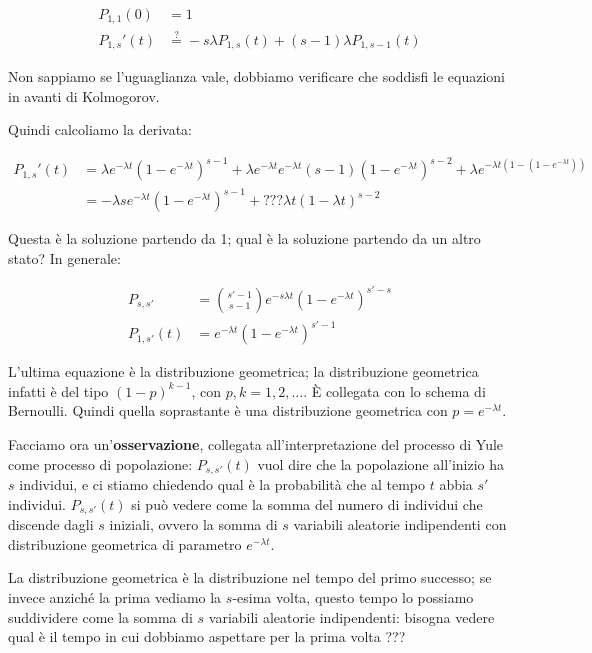 \documentclass[a4paper,12pt]{book}
\begin{document}
\begin{align*}
	P_{1,1}(0) & = 1 \\
	P_{1,s}'(t) & \overset{?}{=} -s \lambda P_{1,s}(t) + (s-1)\lambda P_{1,s-1}(t)
\end{align*}

Non sappiamo se l'uguaglianza vale, dobbiamo verificare che soddisfi le equazioni in avanti di Kolmogorov. 


Quindi calcoliamo la derivata:

\begin{align*}
	P_{1,s}'(t) & = \lambda e^{-\lambda t }(1 - e^{-\lambda t})^{s-1} + \lambda e^{-\lambda t} e^{-\lambda t}(s-1)(1-e^{-\lambda t})^{s-2}  + \lambda e^{-\lambda t(1 - (1- e^{-\lambda t}))} \\ %
	& = -\lambda s e^{-\lambda t}(1 - e^{-\lambda t})^{s-1} + ??? \lambda t(1 -\lambda t)^{s-2} %
\end{align*}

Questa è la soluzione partendo da 1; qual è la soluzione partendo da un altro stato? In generale:

\begin{align*}
	P_{s,s'} & = \binom{s'-1}{s-1}e^{-s\lambda t} (1 - e^{-\lambda t})^{s'-s} \\
	P_{1,s'}(t) & = e^{-\lambda t} (1 - e^{-\lambda t})^{s'-1}
\end{align*}

L'ultima equazione è la distribuzione geometrica; la distribuzione geometrica infatti è del tipo $ (1-p)^{k-1} $, con $ p,k = 1, 2, ... $. È collegata con lo schema di Bernoulli. Quindi quella soprastante è una distribuzione geometrica con $ p = e^{-\lambda t} $.

Facciamo ora un'\textbf{osservazione}, collegata all'interpretazione del processo di Yule come processo di popolazione: $ P_{s,s'}(t) $ vuol dire che la popolazione all'inizio ha $ s $ individui, e ci stiamo chiedendo qual è la probabilità che al tempo $ t $ abbia $ s' $ individui. $ P_{s,s'}(t) $ si può vedere come la somma del numero di individui che discende dagli $ s $ iniziali, ovvero la somma di $ s $ variabili aleatorie indipendenti con distribuzione geometrica di parametro $ e^{-\lambda t} $.

La distribuzione geometrica è la distribuzione nel tempo del primo successo; se invece anziché la prima vediamo la $ s $-esima volta, questo tempo lo possiamo suddividere come la somma di $ s $ variabili aleatorie indipendenti: bisogna vedere qual è il tempo in cui dobbiamo aspettare per la prima volta ??? %
\end{document}
